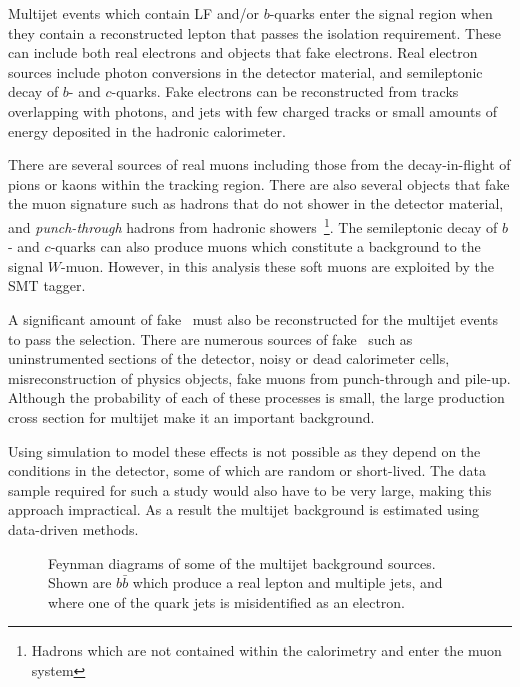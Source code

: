Multijet events which contain LF and/or $b$-quarks enter the signal region when they contain a reconstructed lepton that passes the isolation requirement. These can include both real electrons and objects that fake electrons. Real electron sources include photon conversions in the detector material, and semileptonic decay of $b$- and $c$-quarks. Fake electrons can be reconstructed from tracks overlapping with photons, and jets with few charged tracks or small amounts of energy deposited in the hadronic calorimeter.

There are several sources of real muons including those from the decay-in-flight of pions or kaons within the tracking region. There are also several objects that fake the muon signature such as hadrons that do not shower in the detector material, and \emph{punch-through} hadrons from hadronic showers~\footnote{Hadrons which are not contained within the calorimetry and enter the muon system}. The semileptonic decay of $b$- and $c$-quarks can also produce muons which constitute a background to the signal $W$-muon. However, in this analysis these soft muons are exploited by the SMT tagger.

A significant amount of fake \met\ must also be reconstructed for the multijet events to pass the selection. There are numerous sources of fake \met\ such as uninstrumented sections of the detector, noisy or dead calorimeter cells, misreconstruction of physics objects, fake muons from punch-through and pile-up. Although the probability of each of these processes is small, the large production cross section for multijet make it an important background.

Using simulation to model these effects is not possible as they depend on the conditions in the detector, some of which are random or short-lived. The data sample required for such a study would also have to be very large, making this approach impractical. As a result the multijet background is estimated using data-driven methods.

\begin{figure}[htbp]
  \centering
    \begin{minipage}[][][t]{\textwidth}
      \centering
        
        \label{fig:MultiJetBkgReal}
    \end{minipage}
    
    \begin{minipage}[][][t]{\textwidth}
      \centering
        
        \label{fig:MultiJetBkgFake}
    \end{minipage}
    \caption[Feynman diagrams of some of the multijet background sources.]{Feynman diagrams of some of the multijet background sources. Shown are  $b\bar{b}$ which produce a real lepton and multiple jets, and  where one of the quark jets is misidentified as an electron.}\label{fig:MultiJetBkg}
\end{figure}

